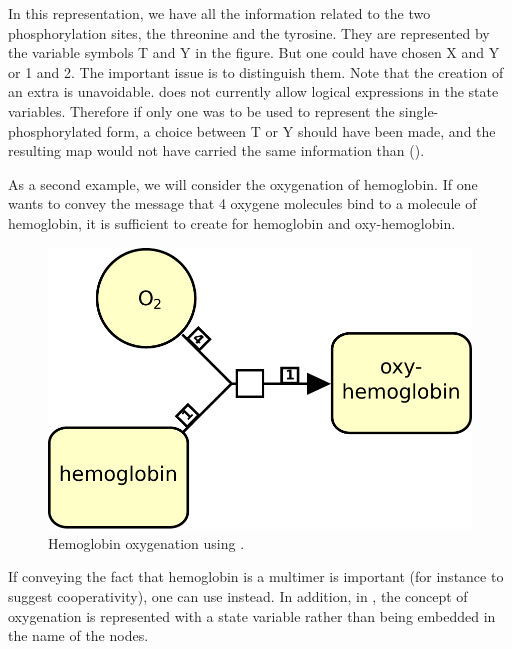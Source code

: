 In this representation, we have all the information related to the two phosphorylation sites, the threonine and the tyrosine. They are represented by the variable symbols T and Y in the figure. But one could have chosen X and Y or 1 and 2. The important issue is to distinguish them. Note that the creation of an extra  is unavoidable. \SBGNPDLone does not currently allow logical expressions in the state variables. Therefore if only one  was to be used to represent the single-phosphorylated form, a choice between T or Y should have been made, and the resulting map would not have carried the same information than  ().

As a second example, we will consider the oxygenation of hemoglobin. If one wants to convey the message that 4 oxygene molecules bind to a molecule of hemoglobin, it is sufficient to create  for hemoglobin and oxy-hemoglobin. 

\begin{figure}[htb]
  \centering
  \includegraphics[scale = 0.4]{le_images/hemoglobin-macromolecule}
  \caption{Hemoglobin oxygenation using .}
  \label{fig:hemoglobin-macromolecule}
\end{figure}

If conveying the fact that hemoglobin is a multimer is important (for instance to suggest cooperativity), one can use  instead. In addition, in , the concept of oxygenation is represented with a state variable rather than being embedded in the name of the nodes.

